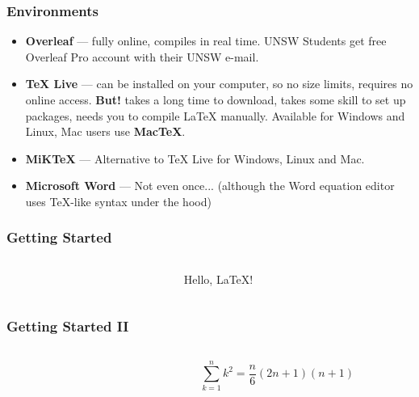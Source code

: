 \documentclass{beamer}
\begin{document}
\begin{frame}
	\frametitle{Environments}
	\begin{itemize}
		\item \textbf{Overleaf} --- fully online, compiles in real time. UNSW Students get free Overleaf Pro account with their UNSW e-mail.
		\item \textbf{TeX Live} --- can be installed on your computer, so no size limits, requires no online access. \textbf{But!} takes a long time to download, takes some skill to set up packages, needs you to compile \LaTeX{} manually. Available for Windows and Linux, Mac users use \textbf{MacTeX}.
		\item \textbf{MiKTeX} --- Alternative to TeX Live for Windows, Linux and Mac.
		\item \textbf{Microsoft Word} --- Not even once... (although the Word equation editor uses TeX-like syntax under the hood)
	\end{itemize}
\end{frame}

\begin{frame}
	\frametitle{Getting Started}
	\begin{columns}
		\begin{column}{0.48\textwidth}
			\begin{center}
				
			\end{center}
		\end{column}
		\begin{column}{0.48\textwidth}
			\begin{center}
				\textrm{Hello, \LaTeX{}!}
			\end{center}
		\end{column}
	\end{columns}
\end{frame}

\begin{frame}
	\frametitle{Getting Started II}
	\begin{columns}
		\begin{column}{0.48\textwidth}
			\begin{center}
				
			\end{center}
		\end{column}
		\begin{column}{0.48\textwidth}
			\begin{center}
				\[
					\sum^n_{k=1}k^2=\frac{n}{6}(2n+1)(n+1)
				\]
			\end{center}
		\end{column}
	\end{columns}
\end{frame}
\end{document}
